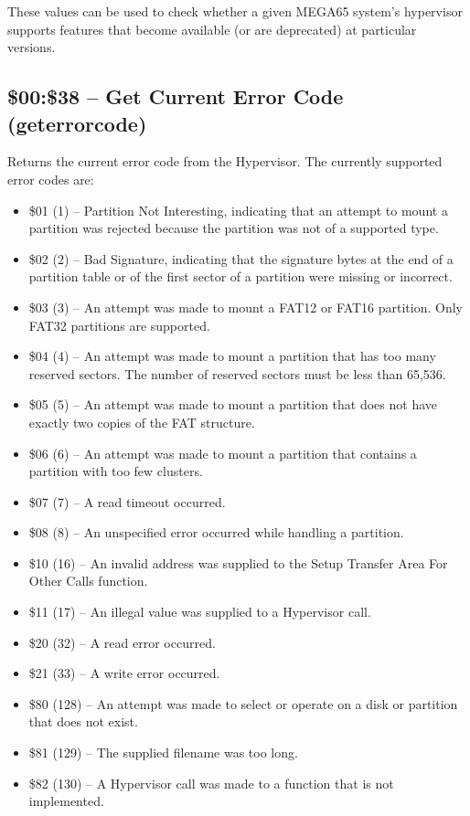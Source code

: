 These values can be used to check whether a given MEGA65 system's hypervisor
supports features that become available (or are deprecated) at particular versions.

\subsection{\$00:\$38 -- Get Current Error Code (geterrorcode)}

Returns the current error code from the Hypervisor.  The currently supported
error codes are:

\begin{itemize}
\item \$01 (1) -- Partition Not Interesting, indicating that an attempt to mount a partition was rejected because the partition was not of a supported type.
\item \$02 (2) -- Bad Signature, indicating that the signature bytes at the end of a partition table or of the first sector of a partition were missing or incorrect.
\item \$03 (3) -- An attempt was made to mount a FAT12 or FAT16 partition.  Only FAT32 partitions are supported.
\item \$04 (4) -- An attempt was made to mount a partition that has too many reserved sectors. The number of reserved sectors must be less than 65,536.
  \item \$05 (5) -- An attempt was made to mount a partition that does not have exactly two copies of the FAT structure.
\item \$06 (6) -- An attempt was made to mount a partition that contains a partition with too few clusters.
\item \$07 (7) -- A read timeout occurred.
  \item \$08 (8) -- An unspecified error occurred while handling a partition.
\item \$10 (16) -- An invalid address was supplied to the Setup Transfer Area For Other Calls function.
\item \$11 (17) -- An illegal value was supplied to a Hypervisor call.
\item \$20 (32) -- A read error occurred.
\item \$21 (33) -- A write error occurred.
\item \$80 (128) -- An attempt was made to select or operate on a disk or partition that does not exist.
\item \$81 (129) -- The supplied filename was too long.
\item \$82 (130) -- A Hypervisor call was made to a function that is not implemented. 

\end{itemize}
